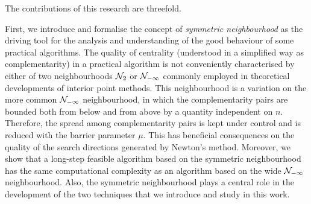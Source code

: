 The contributions of this research are threefold.

First, we introduce and formalise the concept of 
{\em symmetric neighbourhood} as the
driving tool for the analysis and understanding of the good behaviour
of some practical algorithms. 
The quality of centrality (understood in a simplified way 
as complementarity) in a practical algorithm is not 
conveniently characterised by either of two neighbourhoods 
$\mathcal{N}_2$ or $\mathcal{N}_{-\infty}$ commonly employed in 
theoretical developments of interior point methods.
This neighbourhood is a variation on the more common
$\mathcal{N}_{-\infty}$ neighbourhood, in which the complementarity pairs
are bounded both from below and from above by a quantity independent on $n$.
Therefore, the spread among complementarity pairs is kept
under control and is reduced with the barrier parameter $\mu$.
This has beneficial consequences on the quality of the search
directions generated by Newton's method. Moreover, we show that
a long-step feasible algorithm based on the symmetric neighbourhood
has the same computational complexity as an algorithm based
on the wide $\mathcal{N}_{-\infty}$ neighbourhood.
Also, the symmetric neighbourhood plays a central role in the development 
of the two techniques that we introduce and study in this work.

